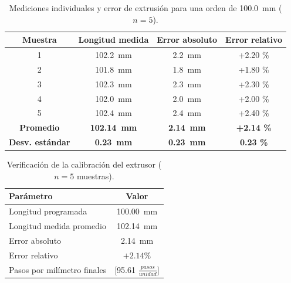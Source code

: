 \begin{table}[htbp]
    \centering
    \caption{Mediciones individuales y error de extrusión para una orden de \qty{100.0}{\mm} ($n = 5$).}
    \label{tab:muestras_extrusor}
    \begin{tabular}{cccc}
        \toprule
        \textbf{Muestra} & \textbf{Longitud medida} & \textbf{Error absoluto} & \textbf{Error relativo} \\
        \midrule
        1 & \qty{102.2}{\mm} & \qty{+2.2}{\mm} & +2.20 \% \\
        2 & \qty{101.8}{\mm} & \qty{+1.8}{\mm} & +1.80 \% \\
        3 & \qty{102.3}{\mm} & \qty{+2.3}{\mm} & +2.30 \% \\
        4 & \qty{102.0}{\mm} & \qty{+2.0}{\mm} & +2.00 \% \\
        5 & \qty{102.4}{\mm} & \qty{+2.4}{\mm} & +2.40 \% \\
        \midrule
        \textbf{Promedio} & \textbf{\qty{102.14}{\mm}} & \textbf{\qty{+2.14}{\mm}} & \textbf{+2.14 \%} \\
        \textbf{Desv. estándar} & \textbf{\qty{0.23}{\mm}} & \textbf{\qty{0.23}{\mm}} & \textbf{0.23 \%} \\
        \bottomrule
    \end{tabular}
\end{table}

\begin{table}[htbp]
    \centering
    \caption{Verificación de la calibración del extrusor ($n = 5$ muestras).}
    \label{tab:calibracion_extrusor}
    \begin{tabular}{lc}
        \toprule
        \textbf{Parámetro} & \textbf{Valor} \\
        \midrule
        Longitud programada          & \qty{100.00}{\mm} \\
        Longitud medida promedio     & \qty{102.14}{\mm} \\
        Error absoluto               & \qty{+2.14}{\mm} \\
        Error relativo               & $+2.14 \%$ \\
        Pasos por milímetro finales  & [95.61 $\frac{pasos}{unidad}$] \\
        \bottomrule
    \end{tabular}
\end{table}

%
%

